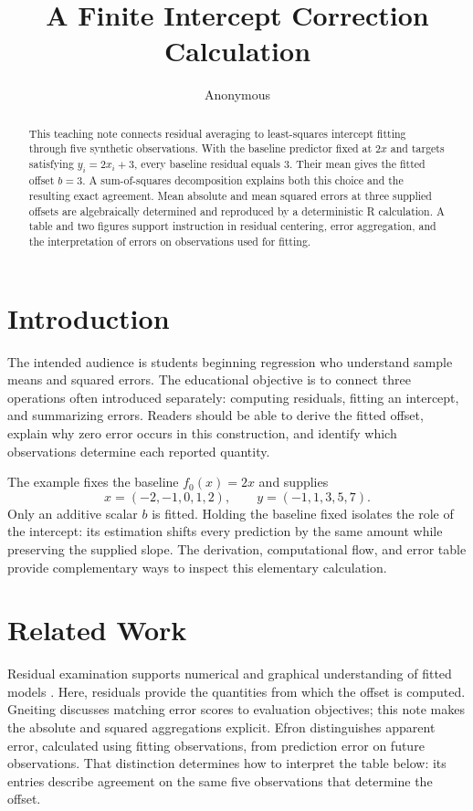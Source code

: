 \documentclass[11pt]{article}
\title{A Finite Intercept Correction Calculation}
\author{Anonymous}
\date{}
\begin{document}
\maketitle

\begin{abstract}
This teaching note connects residual averaging to least-squares intercept fitting through five synthetic observations. With the baseline predictor fixed at $2x$ and targets satisfying $y_i=2x_i+3$, every baseline residual equals $3$. Their mean gives the fitted offset $b=3$. A sum-of-squares decomposition explains both this choice and the resulting exact agreement. Mean absolute and mean squared errors at three supplied offsets are algebraically determined and reproduced by a deterministic R calculation. A table and two figures support instruction in residual centering, error aggregation, and the interpretation of errors on observations used for fitting.
\end{abstract}

\section{Introduction}

The intended audience is students beginning regression who understand sample means and squared errors. The educational objective is to connect three operations often introduced separately: computing residuals, fitting an intercept, and summarizing errors. Readers should be able to derive the fitted offset, explain why zero error occurs in this construction, and identify which observations determine each reported quantity.

The example fixes the baseline $f_0(x)=2x$ and supplies
\[
x=(-2,-1,0,1,2), \qquad y=(-1,1,3,5,7).
\]
Only an additive scalar $b$ is fitted. Holding the baseline fixed isolates the role of the intercept: its estimation shifts every prediction by the same amount while preserving the supplied slope. The derivation, computational flow, and error table provide complementary ways to inspect this elementary calculation.

\section{Related Work}

Residual examination supports numerical and graphical understanding of fitted models \cite{Anscombe1963ExaminationAnalysis}. Here, residuals provide the quantities from which the offset is computed. Gneiting \cite{Gneiting2011MakingEvaluating} discusses matching error scores to evaluation objectives; this note makes the absolute and squared aggregations explicit. Efron \cite{Efron1986HowBiased} distinguishes apparent error, calculated using fitting observations, from prediction error on future observations. That distinction determines how to interpret the table below: its entries describe agreement on the same five observations that determine the offset.
\end{document}
